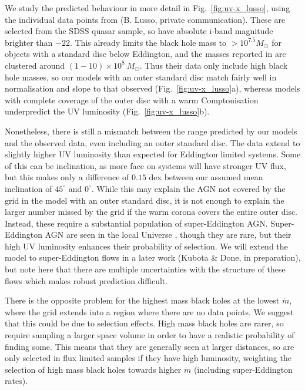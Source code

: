 \documentclass[a4paper,fleqn,usenatbib]{mnras}
\begin{document}
We study the predicted behaviour in more detail in
Fig.~\ref{fig:uv-x_lusso}, using the individual data points from
\cite{lusso2017} (B. Lusso, private communication). These are selected
from the SDSS quasar sample, so have absolute i-band magnitude
brighter than $-22$. This already limits the black hole mass to
$>10^{7.5}M_\odot$ for objects with a standard disc below
Eddington, and the masses reported in \citep[their Fig.6]{lusso2012} are 
clustered around $(1-10)\times 10^8~M_\odot$. 
Thus their data only include high black hole masses, so our models
with an outer standard disc match fairly well in normalisation and slope
to that observed (Fig.~\ref{fig:uv-x_lusso}a), whereas models with
complete coverage of the outer disc with a warm Comptonisation
underpredict the UV luminosity (Fig.~\ref{fig:uv-x_lusso}b).

Nonetheless, there is still a mismatch between the range predicted by
our models and the observed data, even including an outer
standard disc. The data extend to slightly higher UV luminosity than
expected for Eddington limited systems. Some of this can be inclination, as
more face on systems will have stronger UV flux, but this makes only a difference
of $0.15$ dex between our assumed mean inclination of $45^\circ$ and $0^\circ$. 
While this may explain the AGN not covered by the grid in the model with an outer standard
disc, it is not enough to explain the larger number missed by the grid if the warm 
corona covers the entire outer disc. Instead, these require a substantial 
population of super-Eddington AGN. Super-Eddington AGN are seen in the local Universe
\citep{jin2015,done2016,jin2017}, though they are rare, but their high
UV luminosity enhances their probability of selection.
We will extend the model to super-Eddington flows in a later work (Kubota \& Done, in preparation), but note here that there are multiple uncertainties with the structure of these flows which makes robust prediction difficult. 

There is the opposite problem for the highest mass black holes at the lowest
$\dot{m}$, where the grid extends into a region where there are no data points. 
We suggest that this could be due to selection
effects.  High mass black holes are rarer, so require sampling a
larger space volume in order to have a realistic probability of
finding some. This means that they are generally seen at larger
distances, so are only selected in flux limited samples if they have
high luminosity, weighting the selection of high mass black holes
towards higher $\dot{m}$ (including super-Eddington rates).
\end{document}
